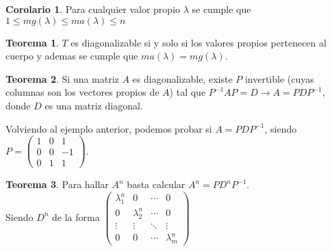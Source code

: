 \documentclass[10pt]{article}
\theoremstyle{definition}
\newtheorem{theorem}{Teorema}[section]
\newtheorem{corollary}{Corolario}[theorem]
\begin{document}
\begin{corollary}
	Para cualquier valor propio $\lambda$ se cumple que $1\le mg(\lambda) \le ma(\lambda) \le n$
\end{corollary}
\begin{theorem}
	$T$ es diagonalizable si y solo si los valores propios pertenecen al cuerpo y ademas se cumple que $ma(\lambda)=mg(\lambda)$.
\end{theorem}
\begin{theorem}
	Si una matriz $A$ es diagonalizable, existe $P$ invertible (cuyas columnas son los vectores propios de $A$) tal que $P^{-1}AP=D \rightarrow A=PDP^{-1}$, donde $D$ es una matriz diagonal.
\end{theorem}
Volviendo al ejemplo anterior, podemos probar si $A=PDP^{-1}$, siendo $P=\begin{pmatrix} 1&0&1\\0&0&-1\\0&1&1 \end{pmatrix} $.
\begin{theorem}
	Para hallar $A^n$ basta calcular $A^n=PD^nP^{-1}$.\\
	Siendo $D^n$ de la forma $\begin{pmatrix}
			\lambda _{1}^{n} & 0                & \cdots & 0                \\
			0                & \lambda _{2}^{n} & \cdots & 0                \\
			\vdots           & \vdots           & \ddots & \vdots           \\
			0                & 0                & \cdots & \lambda _{m}^{n}
		\end{pmatrix}$
\end{theorem}\newpage
\end{document}
